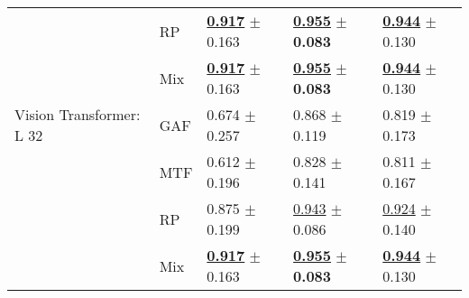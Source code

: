 \begin{tabular}[t]{lllll}
 & RP & \underline{\textbf{\textcolor[rgb]{0.0000000000,0.5000000000,0}{0.917}}} $\pm$ \textcolor[rgb]{0.6327066559,0.3672933441,0}{0.163} & \underline{\textbf{\textcolor[rgb]{0.0000000000,0.5000000000,0}{0.955}}} $\pm$ \textbf{\textcolor[rgb]{0.0000000000,0.5000000000,0}{0.083}} & \underline{\textbf{\textcolor[rgb]{0.0000000000,0.5000000000,0}{0.944}}} $\pm$ \textcolor[rgb]{0.0065585724,0.5000000000,0}{0.130} \\
 & Mix & \underline{\textbf{\textcolor[rgb]{0.0000000000,0.5000000000,0}{0.917}}} $\pm$ \textcolor[rgb]{0.6327066559,0.3672933441,0}{0.163} & \underline{\textbf{\textcolor[rgb]{0.0000000000,0.5000000000,0}{0.955}}} $\pm$ \textbf{\textcolor[rgb]{0.0000000000,0.5000000000,0}{0.083}} & \underline{\textbf{\textcolor[rgb]{0.0000000000,0.5000000000,0}{0.944}}} $\pm$ \textcolor[rgb]{0.0065585724,0.5000000000,0}{0.130} \\
Vision Transformer: L 32 & GAF & \textcolor[rgb]{0.5531609195,0.4468390805,0}{0.674} $\pm$ \textcolor[rgb]{1.0000000000,0.0000000000,0}{0.257} & \textcolor[rgb]{0.5561224490,0.4438775510,0}{0.868} $\pm$ \textcolor[rgb]{0.5062177735,0.4937822265,0}{0.119} & \textcolor[rgb]{0.5294117647,0.4705882353,0}{0.819} $\pm$ \textcolor[rgb]{0.2883381018,0.5000000000,0}{0.173} \\
 & MTF & \textcolor[rgb]{0.6922413793,0.3077586207,0}{0.612} $\pm$ \textcolor[rgb]{0.7598126938,0.2401873062,0}{0.196} & \textcolor[rgb]{0.8140074212,0.1859925788,0}{0.828} $\pm$ \textcolor[rgb]{0.8133655464,0.1866344536,0}{0.141} & \textcolor[rgb]{0.5668449198,0.4331550802,0}{0.811} $\pm$ \textcolor[rgb]{0.2469167869,0.5000000000,0}{0.167} \\
 & RP & \textcolor[rgb]{0.0948275862,0.5000000000,0}{0.875} $\pm$ \textcolor[rgb]{0.7749042320,0.2250957680,0}{0.199} & \underline{\textcolor[rgb]{0.0765306122,0.5000000000,0}{0.943}} $\pm$ \textcolor[rgb]{0.0436410935,0.5000000000,0}{0.086} & \underline{\textcolor[rgb]{0.0882352941,0.5000000000,0}{0.924}} $\pm$ \textcolor[rgb]{0.0707312682,0.5000000000,0}{0.140} \\
 & Mix & \underline{\textbf{\textcolor[rgb]{0.0000000000,0.5000000000,0}{0.917}}} $\pm$ \textcolor[rgb]{0.6327066559,0.3672933441,0}{0.163} & \underline{\textbf{\textcolor[rgb]{0.0000000000,0.5000000000,0}{0.955}}} $\pm$ \textbf{\textcolor[rgb]{0.0000000000,0.5000000000,0}{0.083}} & \underline{\textbf{\textcolor[rgb]{0.0000000000,0.5000000000,0}{0.944}}} $\pm$ \textcolor[rgb]{0.0065585724,0.5000000000,0}{0.130} \\
\bottomrule
\end{tabular}

